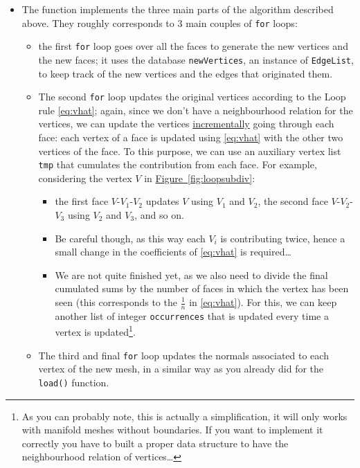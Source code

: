 \documentclass[a4paper,11pt]{article}
\newcommand{\hilight}[1]{\colorbox{bg}{#1}}
\newcommand{\coden}[1]{\texttt{#1}}
\newcommand{\code}[1]{\hilight{\texttt{#1}}}
\newcommand{\fig}[1]{\hyperref[#1]{\mbox{Figure \ref*{#1}}}\xspace}
\begin{document}
\begin{enumerate}
\begin{itemize}
        \item The function implements the three main parts of the algorithm described above. They roughly corresponds to 3 main couples of \coden{for} loops:
        \begin{itemize}
            \item the first \coden{for} loop goes over all the faces to generate the new vertices and the new faces; it uses the database \code{newVertices}, an instance of \coden{EdgeList}, to keep track of the new vertices and the edges that originated them.

            \item The second \coden{for} loop updates the original vertices according to the Loop rule \eqref{eq:vhat}; again, since we don't have a neighbourhood relation for the vertices, we can update the vertices \uline{incrementally} going through each face: each vertex of a face is updated using \eqref{eq:vhat} with the other two vertices of the face. To this purpose, we can use an auxiliary vertex list \code{tmp} that cumulates the contribution from each face. For example, considering the vertex $V$ in \fig{fig:loopsubdiv}:
            \begin{itemize}
            	\item the first face $V$-$V_1$-$V_2$ updates $V$ using $V_1$ and $V_2$, the second face $V$-$V_2$-$V_3$ using $V_2$ and $V_3$, and so on.
            	\item Be careful though, as this way each $V_i$ is contributing twice, hence a small change in the coefficients of \eqref{eq:vhat} is required\ldots
            	\item We are not quite finished yet, as we also need to divide the final cumulated sums by the number of faces in which the vertex has been seen (this corresponds to the $\frac{1}{n}$ in \eqref{eq:vhat}). For this, we can keep another list of integer \code{occurrences} that is updated every time a vertex is updated\footnote{As you can probably note, this is actually a simplification, it will only works with manifold meshes without boundaries. If you want to implement it correctly you have to built a proper data structure to have the neighbourhood relation of vertices\ldots}.
             \end{itemize}

            \item The third and final \coden{for} loop updates the normals associated to each vertex of the new mesh, in a similar way as you already did for the \coden{load()} function.
        \end{itemize}
    \end{itemize}
\end{enumerate}
\end{document}
